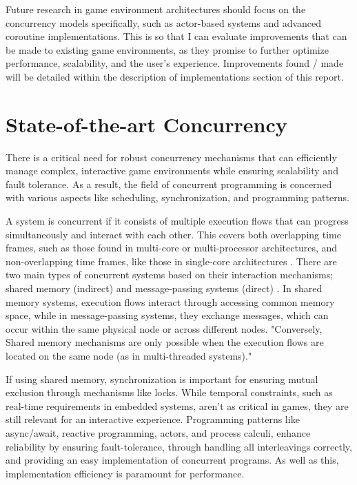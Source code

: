 \documentclass[]{final}
\begin{document}
Future research in game environment architectures should focus
on the concurrency models specifically, such as actor-based systems and advanced coroutine
implementations. This is so that I can evaluate improvements that can be made to
existing game environments, as they promise to further optimize performance, scalability,
and the user's experience. Improvements found / made will be detailed within
the description of implementations section of this report.

\chapter{State-of-the-art Concurrency}

There is a critical need for robust concurrency mechanisms that can efficiently
manage complex, interactive game environments while ensuring scalability
and fault tolerance. As a result, the field of concurrent programming is concerned
with various aspects like scheduling, synchronization, and programming patterns.

A system is concurrent if it consists of multiple execution flows that
can progress simultaneously and interact with each other.
This covers both overlapping time frames, such as those found
in multi-core or multi-processor architectures, and non-overlapping
time frames, like those in single-core architectures \cite{bianchi_survey_2018}.
There are two main types of concurrent systems based on their interaction
mechanisms; shared memory (indirect) and message-passing systems (direct) \cite{bianchi_survey_2018}.
In shared memory systems, execution flows interact through accessing
common memory space, while in message-passing systems,
they exchange messages, which can occur within the same physical
node or across different nodes. "Conversely, Shared memory mechanisms
are only possible when the execution flows are
located on the same node (as in multi-threaded systems)."\cite{bianchi_survey_2018}

If using shared memory, synchronization is important
for ensuring mutual exclusion through mechanisms like locks.
While temporal constraints, such as real-time requirements in embedded systems,
aren't as critical in games, they are still relevant for an interactive
experience. Programming patterns like async/await, reactive programming,
actors, and process calculi, enhance reliability by ensuring fault-tolerance,
through handling all interleavings correctly,
and providing an easy implementation of concurrent programs. As well as this, implementation efficiency
is paramount for performance.
\end{document}
